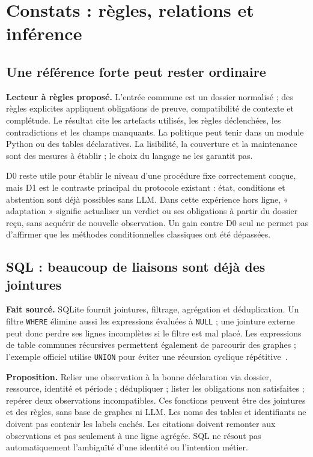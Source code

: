 \documentclass[11pt,a4paper]{article}
\newcommand{\code}[1]{\nolinkurl{#1}}
\begin{document}
\section{Constats : règles, relations et inférence}
\subsection{Une référence forte peut rester ordinaire}
\textbf{Lecteur à règles proposé.} L'entrée commune est un dossier normalisé ; des règles
explicites appliquent obligations de preuve, compatibilité de contexte et
complétude. Le résultat cite les artefacts utilisés, les règles déclenchées,
les contradictions et les champs manquants. La politique peut tenir dans un
module Python ou des tables déclaratives. La lisibilité, la couverture et la
maintenance sont des mesures à établir ; le choix du langage ne les garantit pas.

D0 reste utile pour établir le niveau d'une procédure fixe correctement conçue,
mais D1 est le contraste principal du protocole existant : état, conditions
et abstention sont déjà
possibles sans LLM. Dans cette expérience hors ligne, « adaptation » signifie
actualiser un verdict ou ses obligations à partir du dossier reçu, sans acquérir
de nouvelle observation. Un gain contre D0 seul ne permet pas d'affirmer que
les méthodes conditionnelles classiques ont été dépassées.

\subsection{SQL : beaucoup de liaisons sont déjà des jointures}
\textbf{Fait sourcé.} SQLite fournit jointures, filtrage, agrégation et
déduplication. Un filtre \code{WHERE} élimine aussi les expressions évaluées
à \code{NULL} ; une jointure externe peut donc perdre ses lignes incomplètes
si le filtre est mal placé. Les expressions de table communes récursives
permettent également de parcourir des graphes ; l'exemple officiel utilise
\code{UNION} pour éviter une récursion cyclique répétitive~\cite{sql}.

\textbf{Proposition.} Relier une observation à la bonne déclaration via
dossier, ressource, identité et période ; dédupliquer ; lister les obligations
non satisfaites ; repérer deux observations incompatibles. Ces fonctions peuvent
être des jointures et des règles, sans base de graphes ni LLM. Les noms des tables
et identifiants ne doivent pas contenir les labels cachés. Les citations doivent
remonter aux observations et pas seulement à une ligne agrégée. SQL ne résout
pas automatiquement l'ambiguïté d'une identité ou l'intention métier.
\end{document}
